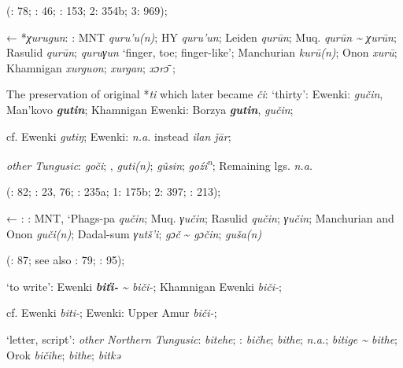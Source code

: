 \documentclass[output=paper,colorlinks,citecolor=brown]{langscibook}
\begin{document}
    (\citealt{Castrén1856}: 78; \citealt{Janhunen1991}: 46; \citealt{Chaoke2014bB}: 153; \citealt{Cincius1975B} 2: 354b; \citealt{Hauer1952} 3: 969); 

    ←  *\textit{χurugun}: : MNT \textit{quru’u(n)}; HY \textit{quru’un}; Leiden \textit{qurūn}; Muq. \textit{qurūn {\textasciitilde} χurūn}; Rasulid \textit{qurūn};  \textit{quruγun} ‘finger, toe; finger-like’; Manchurian  \textit{kurū(n)}; Onon  \textit{xurū};  Khamnigan \textit{xurguon};  \textit{xurgan};  \textit{xɔr\={ɔ}} \citep[90]{Khabtagaeva2017};
\z

    \ex The preservation of original  *\textit{ti} which later became \textit{či}:
\ea ‘thirty’:  Ewenki:  \textit{gučin}, Man’kovo \textbf{\textit{gutin}}; Khamnigan Ewenki: Borzya \textbf{\textit{gutin}},  \textit{gučin};

    cf.  Ewenki \textit{gutiŋ};  Ewenki: \textit{n.a.} instead \textit{ilan ǰār};

    \textit{other Tungusic}:  \textit{goči}; ,  \textit{guti(n)};  \textit{gûsin};  \textit{goźi\textsuperscript{n}}; Remaining lgs. \textit{n.a.} 
    
    (\citealt{Castrén1856}: 82; \citealt{Janhunen1991}: 23, 76; \citealt{Dorji1998}: 235a; \citealt{Cincius1975B} 1: 175b; \citealt{Hauer1952} 2: 397; \citealt{Zikmundová2013a}: 213);

    ← : : MNT, ‘Phags{}-pa \textit{qučin}; Muq. \textit{γučin}; Rasulid \textit{qučin};  \textit{γučin}; Manchurian and Onon  \textit{guči(n)}; Dadal-sum  \textit{γutš’i};  \textit{gɔč} {\textasciitilde} \textit{gɔčin};  \textit{guša(n)}
    
    (\citealt{Khabtagaeva2017}: 87; see also \citealt{Doerfer1985}: 79; \citealt{Rozycki1994}: 95);

    \ex ‘to write’:  Ewenki \textbf{\textit{biťi-}} \textit{{\textasciitilde} biči-}; Khamnigan Ewenki \textit{biči-};

    cf.  Ewenki \textit{biti-};  Ewenki: Upper Amur \textit{biči-};

    \ex ‘letter, script’: \textit{other Northern Tungusic}:  \textit{bitehe}; \textit{}:  \textit{bičhe};  \textit{bithe};  \textit{n.a.};  \textit{bitige {\textasciitilde} bithe}; Orok \textit{bičihe};  \textit{bithe};  \textit{bitkǝ}
    
\end{document}
